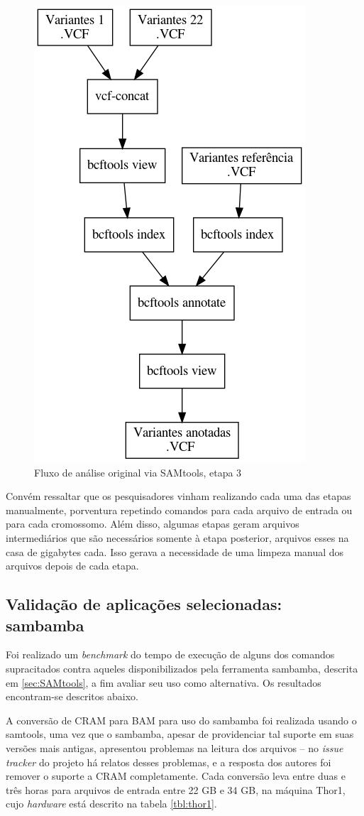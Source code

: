 \documentclass[cic,tc]{iiufrgs}
\begin{document}
\begin{figure}
  \caption{Fluxo de análise original via SAMtools, etapa 3}
    \begin{center}
      \includegraphics[width=0.55\linewidth]{img/stage3_orig.png}
    \end{center}
    \label{fig:stage3_orig}
\end{figure}

Convém ressaltar que os pesquisadores vinham realizando cada uma das etapas
manualmente, porventura repetindo comandos para cada arquivo de entrada ou para
cada cromossomo. Além disso, algumas etapas geram arquivos intermediários que
são necessários somente à etapa posterior, arquivos esses na casa de gigabytes
cada. Isso gerava a necessidade de uma limpeza manual dos arquivos depois de
cada etapa.

\subsection{Validação de aplicações selecionadas: sambamba}

Foi realizado um \textit{benchmark} do tempo de execução de alguns dos comandos
supracitados contra aqueles disponibilizados pela ferramenta sambamba, descrita
em \ref{sec:SAMtools}, a fim avaliar seu uso como alternativa. Os resultados
encontram-se descritos abaixo.

A conversão de CRAM para BAM para uso do sambamba foi realizada usando o
samtools, uma vez que o sambamba, apesar de providenciar tal suporte em suas
versões mais antigas, apresentou problemas na leitura dos arquivos -- no
\textit{issue tracker} do projeto há relatos desses problemas, e a resposta dos
autores foi remover o suporte a CRAM completamente. Cada conversão leva entre
duas e três horas para arquivos de entrada entre 22 GB e 34 GB, na máquina
Thor1, cujo \textit{hardware} está descrito na tabela \ref{tbl:thor1}.
\end{document}
